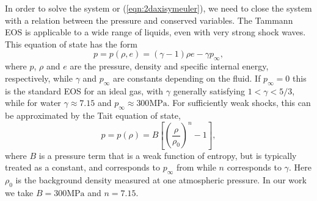 \documentclass{article}
\begin{document}
In order to solve the system  or (\ref{eqn:2daxisymeuler}), we need to close the 
system with a relation between the pressure and conserved variables.  
The Tammann EOS \cite{ivings_toro} is applicable to a wide range of liquids, even with very strong 
shock
waves.  This equation of state has the form
\begin{equation}
	p = p(\rho, e) = (\gamma - 1)\rho e - \gamma p_{\infty},
	\label{eqn:tammaneos}
\end{equation}
where $p$, $\rho$ and $e$ are the pressure, density and specific internal energy, respectively, while $
\gamma$
and $p_\infty$ are constants depending on the fluid.  If $p_\infty=0$ this is the standard EOS for an ideal
gas, with $\gamma$ generally satisfying $1<\gamma < 5/3$, while for water $\gamma \approx 7.15$ and 
$p_\infty
\approx 300 \text{MPa}$.  For sufficiently weak shocks, this can be approximated
by the Tait equation of state,
\begin{equation}
	p = p(\rho) = B\left[ \left(\frac{\rho}{\rho_0}\right)^n - 1\right], 
	\label{eqn:taiteos}
\end{equation}
where $B$ is a pressure term that is a weak function of entropy, but is typically treated as a constant, 
and corresponds to $p_\infty$ from  while $n$ corresponds to $\gamma$.  Here $\rho_0$ is the background density measured at one atmospheric pressure. 
In our work we take $B = 300 \text{MPa}$ and $n = 7.15$.
\end{document}
